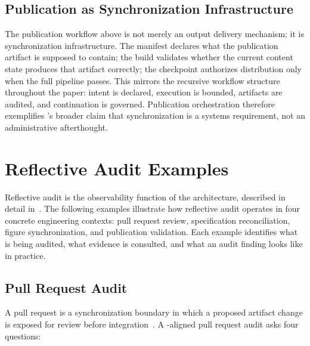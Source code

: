 \subsection{Publication as Synchronization Infrastructure}

The publication workflow above is not merely an output delivery mechanism; it is synchronization infrastructure. The manifest declares what the publication artifact is supposed to contain; the build validates whether the current content state produces that artifact correctly; the checkpoint authorizes distribution only when the full pipeline passes. This mirrors the recursive workflow structure throughout the paper: intent is declared, execution is bounded, artifacts are audited, and continuation is governed. Publication orchestration therefore exemplifies 's broader claim that synchronization is a systems requirement, not an administrative afterthought.


\section{Reflective Audit Examples}
\label{sec:appendix-audit}

Reflective audit is the observability function of the  architecture, described in detail in~. The following examples illustrate how reflective audit operates in four concrete engineering contexts: pull request review, specification reconciliation, figure synchronization, and publication validation. Each example identifies what is being audited, what evidence is consulted, and what an audit finding looks like in practice.

\subsection{Pull Request Audit}

A pull request is a synchronization boundary in which a proposed artifact change is exposed for review before integration~\cite{Jimenez2024SWEBench}. A -aligned pull request audit asks four questions:

